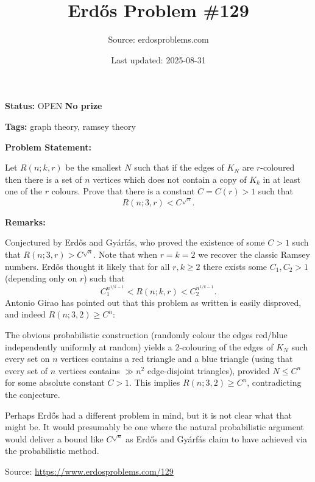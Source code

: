 \documentclass{article}
\title{Erd\H{o}s Problem \#129}
\date{Last updated: 2025-08-31}
\author{Source: erdosproblems.com}
\begin{document}
\maketitle

\noindent\textbf{Status:} OPEN \quad \textbf{No prize}

\noindent\textbf{Tags:} graph theory, ramsey theory

\medskip
\noindent\textbf{Problem Statement:}

Let $R(n;k,r)$ be the smallest $N$ such that if the edges of $K_N$ are $r$-coloured then there is a set of $n$ vertices which does not contain a copy of $K_k$ in at least one of the $r$ colours. Prove that there is a constant $C=C(r)>1$ such that\[R(n;3,r) < C^{\sqrt{n}}.\]

\bigskip
\noindent\textbf{Remarks:}

Conjectured by Erd\H{o}s and Gy\'{a}rf\'{a}s, who proved the existence of some $C>1$ such that $R(n;3,r)>C^{\sqrt{n}}$. Note that when $r=k=2$ we recover the classic Ramsey numbers. Erd\H{o}s thought it likely that for all $r,k\geq 2$ there exists some $C_1,C_2>1$ (depending only on $r$) such that\[ C_1^{n^{1/k-1}}< R(n;k,r) < C_2^{n^{1/k-1}}.\]Antonio Girao has pointed out that this problem as written is easily disproved, and indeed $R(n;3,2) \geq C^{n}$:

The obvious probabilistic construction (randomly colour the edges red/blue independently uniformly at random) yields a 2-colouring of the edges of $K_N$ such every set on $n$ vertices contains a red triangle and a blue triangle (using that every set of $n$ vertices contains $\gg n^2$ edge-disjoint triangles), provided $N \leq C^n$ for some absolute constant $C>1$. This implies $R(n;3,2) \geq C^{n}$, contradicting the conjecture. 

Perhaps Erd\H{o}s had a different problem in mind, but it is not clear what that might be. It would presumably be one where the natural probabilistic argument would deliver a bound like $C^{\sqrt{n}}$ as Erd\H{o}s and Gy\'{a}rf\'{a}s claim to have achieved via the probabilistic method.

\bigskip
\noindent\small{Source: \url{https://www.erdosproblems.com/129}}
\end{document}
